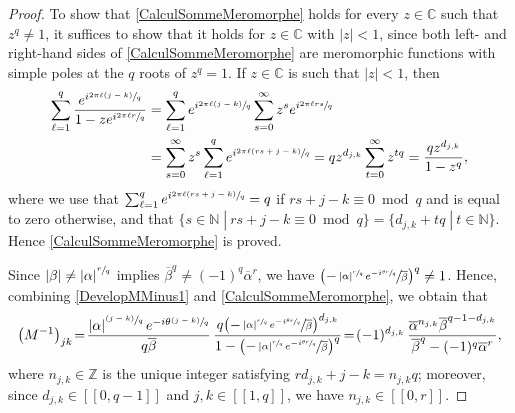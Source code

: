 \documentclass[10pt]{article}
\newcommand{\psfrac}[2]{\sfrac{(#1)}{#2}}
\newcommand{\llbracket}{[\![}
\newcommand{\rrbracket}{]\!]}
\theoremstyle{plain}
\theoremstyle{definition}
\newcommand{\suchthat}{\;|\:}
\newcommand{\abs}[1]{\left\lvert #1\right \rvert}
\numberwithin{equation}{section}\numberwithin{figure}{section}\emergencystretch=3em
\begin{document}
\begin{proof}
To show that \eqref{CalculSommeMeromorphe} holds for every $z \in \mathbb C$ such that $z^q \neq 1$, it suffices to show that it holds for $z \in \mathbb C$ with $\abs{z} < 1$, since both left- and right-hand sides of \eqref{CalculSommeMeromorphe} are meromorphic functions with simple poles at the $q$ roots of $z^q = 1$. If $z \in \mathbb C$ is such that $\abs{z} < 1$, then\vspace*{-3pt}
\begin{align*}
\sum_{\ell=1}^q \frac{e^{i \sfrac{2\pi \ell (j - k)}{q}}}{1 - z e^{i \sfrac{2 \pi \ell r}{q}}} &= \sum_{\ell=1}^q e^{i \sfrac{2\pi \ell (j - k)}{q}} \sum_{s=0}^\infty z^s e^{i \sfrac{2 \pi \ell r s}{q}}\\
&= \sum_{s=0}^\infty z^s \sum_{\ell=1}^q e^{i \sfrac{2\pi \ell (r s + j - k)}{q}} = q z^{d_{j, k}} \sum_{t = 0}^\infty z^{t q} = \frac{q z^{d_{j, k}}}{1 - z^q},
\end{align*}
where we use that $\sum_{\ell=1}^q e^{i \sfrac{2\pi \ell (r s + j - k)}{q}} = q$ if $r s + j - k \equiv 0 \bmod q$ and is equal to zero otherwise, and that $\{s \in \mathbb N \suchthat r s + j - k \equiv 0 \bmod q\} = \{d_{j, k} + t q \suchthat t \in \mathbb N\}$. Hence \eqref{CalculSommeMeromorphe} is proved.

Since $\abs{\beta} \neq \abs{\alpha}^{\sfrac{r}{q}}$ implies $\overline\beta^q \neq (-1)^q \overline\alpha^r$, we have $\bigl(-\sfrac{\abs{\alpha}^{\sfrac{r}{q}} e^{-i\sfrac{\theta r}{q}}}{\overline\beta}\bigr)^q \neq 1$. Hence, combining \eqref{DevelopMMinus1} and \eqref{CalculSommeMeromorphe}, we obtain that\vspace*{-3pt}
\[
\left(M^{-1}\right)_{jk} \!=\! \frac{\abs{\alpha}^{\psfrac{j-k}{q}} e^{-i\theta\psfrac{j-k}{q}}}{q \overline\beta}\, \frac{q \bigl(-\sfrac{\abs{\alpha}^{\sfrac{r}{q}} e^{-i\sfrac{\theta r}{q}}}{\overline\beta}\bigr)^{d_{j, k}}}{1 - \bigl(-\sfrac{\abs{\alpha}^{\sfrac{r}{q}} e^{-i\sfrac{\theta r}{q}}}{\overline\beta}\bigr)^q} \!=\! (-1)^{d_{j, k}}\, \frac{\overline\alpha^{n_{j, k}}\overline\beta^{q-1-d_{j,k}}}{\overline\beta^q - (-1)^q \overline\alpha^r},
\]
where $n_{j, k} \in \mathbb Z$ is the unique integer satisfying $r d_{j, k} + j - k = n_{j, k} q$; moreover, since $d_{j, k} \in \llbracket 0, q-1\rrbracket$ and $j, k \in \llbracket 1, q\rrbracket$, we have $n_{j, k} \in \llbracket 0, r\rrbracket$.


\end{proof}
\end{document}
